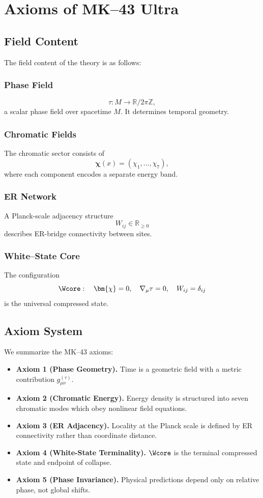 \chapter{Axioms of MK--43 Ultra}

\section{Field Content}

The field content of the theory is as follows:

\subsection{Phase Field}
\[
  \tau : M \to \mathbb{R}/2\pi\mathbb{Z}, 
\]
a scalar phase field over spacetime $M$. 
It determines temporal geometry.

\subsection{Chromatic Fields}
The chromatic sector consists of
\[
  \bm{\chi}(x) = (\chi_1, \dots, \chi_7),
\]
where each component encodes a separate energy band.

\subsection{ER Network}
A Planck-scale adjacency structure
\[
W_{ij} \in \mathbb{R}_{\ge 0}
\]
describes ER-bridge connectivity between sites.

\subsection{White--State Core}
The configuration
\[
\Wcore: \quad
\bm{\chi}=0,\quad \nabla_\mu \tau =0,\quad W_{ij}=\delta_{ij}
\]
is the universal compressed state.

\section{Axiom System}

We summarize the MK--43 axioms:

\begin{itemize}
  \item \textbf{Axiom 1 (Phase Geometry).} Time is a geometric field with a metric contribution $g^{(\tau)}_{\mu\nu}$.
  \item \textbf{Axiom 2 (Chromatic Energy).} Energy density is structured into seven chromatic modes which obey nonlinear field equations.
  \item \textbf{Axiom 3 (ER Adjacency).} Locality at the Planck scale is defined by ER connectivity rather than coordinate distance.
  \item \textbf{Axiom 4 (White-State Terminality).} $\Wcore$ is the terminal compressed state and endpoint of collapse.
  \item \textbf{Axiom 5 (Phase Invariance).} Physical predictions depend only on relative phase, not global shifts.
\end{itemize}

